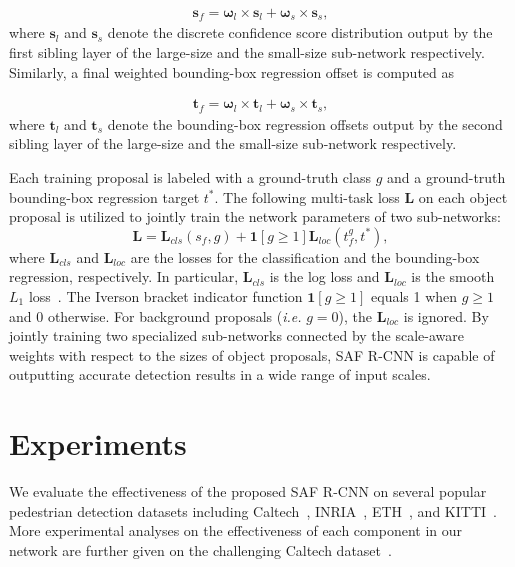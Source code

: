 \documentclass[journal]{IEEEtran}
\begin{document}
\begin{equation}
	\begin{aligned}
		\boldsymbol{s}_f = \boldsymbol{\omega}_l \times \boldsymbol{s}_l + \boldsymbol{\omega}_s \times \boldsymbol{s}_s,
	\end{aligned}
\end{equation}
where $\boldsymbol{s}_l$ and $\boldsymbol{s}_s$ denote the discrete confidence score distribution output by the first sibling layer of the large-size and the small-size sub-network respectively. Similarly, a final weighted bounding-box regression offset is computed as

\begin{equation}
	\begin{aligned}
		\boldsymbol{t}_f = \boldsymbol{\omega}_l \times \boldsymbol{t}_l + \boldsymbol{\omega}_s \times \boldsymbol{t}_s,
	\end{aligned}
\end{equation}
where $\boldsymbol{t}_l$ and $\boldsymbol{t}_s$ denote the bounding-box regression offsets output by the second sibling layer of the large-size and the small-size sub-network respectively. 

Each training proposal is labeled with a ground-truth class $g$ and a ground-truth bounding-box regression target $t^{*}$. The following multi-task loss $\boldsymbol{L}$ on each object proposal is utilized to jointly train the network parameters of two sub-networks:
\begin{equation}\label{eqn:loss}
\boldsymbol{L} = \boldsymbol{L}_{cls}(s_f,g)+\mathbf{1}[g\geq 1]\boldsymbol{L}_{loc}({t}_f^g, t^{*}),
\end{equation}
where $\boldsymbol{L}_{cls}$ and $\boldsymbol{L}_{loc}$ are the losses for the classification and the bounding-box regression, respectively. In particular, $\boldsymbol{L}_{cls}$ is the log loss and $\boldsymbol{L}_{loc}$ is the smooth $L_1$ loss~\cite{girshick2015fast}. The Iverson bracket indicator function $\mathbf{1}[g\geq 1]$ equals 1 when $g\geq 1$ and 0 otherwise. For background proposals (\emph{i.e. }$g=0$), the $\boldsymbol{L}_{loc}$ is ignored. By jointly training two specialized sub-networks connected by the scale-aware weights with respect to the sizes of object proposals, SAF R-CNN is capable of outputting accurate detection results in a wide range of input scales.





\section{Experiments}
We evaluate the effectiveness of the proposed SAF R-CNN on several popular pedestrian detection datasets including Caltech~\cite{dollar2012pedestrian}, INRIA~\cite{dalal2005histograms}, ETH~\cite{ess2007depth}, and KITTI~\cite{geiger2012we}. More experimental analyses on the effectiveness of each component in our network are further given on the challenging Caltech dataset~\cite{dollar2012pedestrian}.
\end{document}
